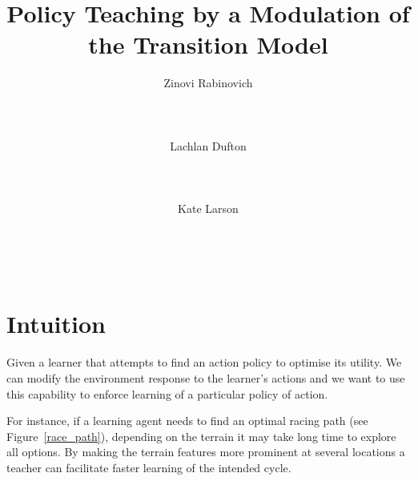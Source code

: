 \documentclass[letterpaper]{aamas2009}
\author{\alignauthor Zinovi Rabinovich\\
  \affaddr{Electronics and Computer Science}\\
  \affaddr{University of Southampton}\\
  \affaddr{Southampton, United Kingdom}\\
  \email{zr@ecs.soton.ac.uk}
\alignauthor Lachlan Dufton\\ 
  \affaddr{Cheriton School of Computer Science}\\
  \affaddr{University of Waterloo}\\
  \affaddr{Waterloo, Canada}\\
  \email{ltdufton@cs.uwaterloo.ca}
\alignauthor Kate Larson\\
  \affaddr{Cheriton School of Computer Science}\\
  \affaddr{University of Waterloo}\\
  \affaddr{Waterloo, Canada}\\
  \email{klarson@cs.uwaterloo.ca}
}
\title{Policy  Teaching by a Modulation of the Transition Model}
\begin{document}
\maketitle

\section{Intuition}
Given a learner that attempts to find an action policy to optimise its
utility. We can modify the environment response to the learner's
actions and we want to use this capability to enforce learning of a
particular policy of action.

For instance, if a learning agent needs to find an optimal racing path
(see Figure~\ref{race_path}), depending on the terrain it may take long
time to explore all options. By making the terrain features more
prominent at several locations a teacher can facilitate faster
learning of the intended cycle.

\begin{figure*}[ht]
{\center 
{}
\\}
\caption{\label{race_path}Unmodified (passive) and augmented environment dynamics for race path finding (colours naturally encode traversability of the cell)}
\end{figure*}

\end{document}
